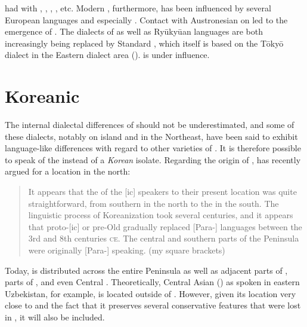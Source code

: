  had  with , , , ,  etc. Modern , furthermore, has been influenced by several European languages and especially . Contact with Austronesian on  led to the emergence of . The dialects of  as well as Ryūkyūan languages are both increasingly being replaced by Standard , which itself is based on the T\=oky\=o dialect in the Eastern dialect area (\citealt{Sanada2007}).  is under  influence.

\section{Koreanic}\label{sec:2.7}
 
The internal dialectal differences of  should not be underestimated, and some of these dialects, notably  on  island and  in the Northeast, have been said to exhibit language-like differences with regard to other varieties of . It is therefore possible to speak of the \textit{}  instead of a \textit{Korean} isolate. Regarding the origin of , \citet[201]{Vovin2013a} has recently argued for a location in the north:

\begin{quote}
It appears that the  of the [ic] speakers to their present location was quite straightforward, from southern  in the north to the  in the south. The linguistic process of Koreanization took several centuries, and it appears that proto-[ic] or pre-Old  gradually replaced [Para-] languages between the 3rd and 8th centuries \textsc{ce}. The central and southern parts of the  Peninsula were originally [Para-] speaking. (my square brackets)
\end{quote}

Today,  is distributed across the entire  Peninsula as well as adjacent parts of , parts of , and even Central . Theoretically, Central Asian  () as spoken in eastern Uzbekistan, for example, is located outside of . However, given its location very close to  and the fact that it preserves several conservative features that were lost in , it will also be included.


